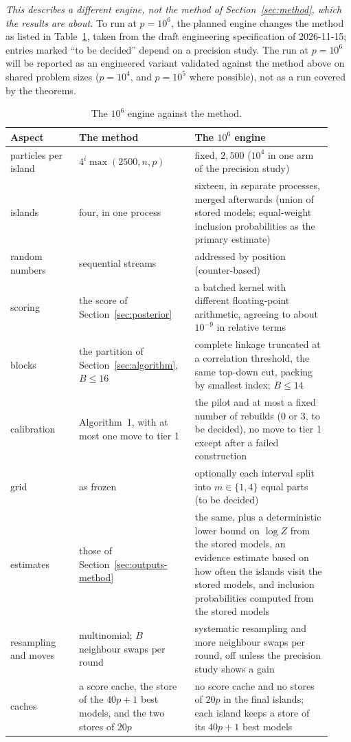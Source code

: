 \emph{This describes a different engine, not the method of Section~\ref{sec:method}, which the results are about.} To run at $p=10^6$, the planned engine changes the method as listed in Table~\ref{tab:1m}, taken from the
draft engineering specification of 2026-11-15; entries marked ``to be decided'' depend on a precision study. The run at
$p=10^6$ will be reported as an engineered variant validated against the method above on shared problem sizes ($p=10^4$,
and $p=10^5$ where possible), not as a run covered by the theorems.

{\small
\begin{longtable}{@{}>{\raggedright\arraybackslash}p{0.2\linewidth}>{\raggedright\arraybackslash}p{0.33\linewidth}>{\raggedright\arraybackslash}p{0.4\linewidth}@{}}
\caption{The $10^6$ engine against the method.}\label{tab:1m}\\
\toprule
Aspect & The method & The $10^6$ engine \\ \midrule \endhead
particles per island & $4^i\max(2500,n,p)$ & fixed, $2{,}500$ ($10^4$ in one arm of the precision study) \\
islands & four, in one process & sixteen, in separate processes, merged afterwards (union of stored models; equal-weight inclusion probabilities as the primary estimate) \\
random numbers & sequential streams & addressed by position (counter-based) \\
scoring & the score of Section~\ref{sec:posterior} & a batched kernel with different floating-point arithmetic, agreeing to about $10^{-9}$ in relative terms \\
blocks & the partition of Section~\ref{sec:algorithm}, $B\le16$ & complete linkage truncated at a correlation threshold, the same top-down cut, packing by smallest index; $B\le14$ \\
calibration & Algorithm~1, with at most one move to tier 1 & the pilot and at most a fixed number of rebuilds (0 or 3, to be decided), no move to tier 1 except after a failed construction \\
grid & as frozen & optionally each interval split into $m\in\{1,4\}$ equal parts (to be decided) \\
estimates & those of Section~\ref{sec:outputs-method} & the same, plus a deterministic lower bound on $\log Z$ from the stored models, an evidence estimate based on how often the islands visit the stored models, and inclusion probabilities computed from the stored models \\
resampling and moves & multinomial; $B$ neighbour swaps per round & systematic resampling and more neighbour swaps per round, off unless the precision study shows a gain \\
caches & a score cache, the store of the $40p+1$ best models, and the two stores of $20p$ & no score cache and no stores of $20p$ in the final islands; each island keeps a store of its $40p+1$ best models \\
\bottomrule
\end{longtable}}


